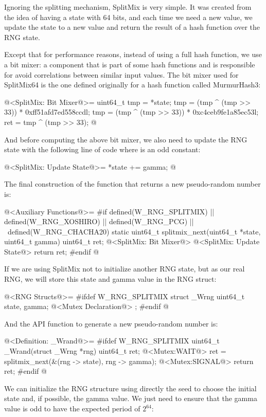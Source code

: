 Ignoring the splitting mechanism, SplitMix is very simple. It was
created from the idea of having a state with 64 bits, and each time we
need a new value, we update the state to a new value and return the
result of a hash function over the RNG state.

Except that for performance reasons, instead of using a full hash
function, we use a bit mixer: a component that is part of some hash
functions and is responsible for avoid correlations between similar
input values. The bit mixer used for SplitMix64 is the one defined
originally for a hash function called MurmurHash3:

\iniciocodigo
@<SplitMix: Bit Mixer@>=
{
  uint64_t tmp = *state;
  tmp = (tmp ^ (tmp >> 33)) * 0xff51afd7ed558ccdl;
  tmp = (tmp ^ (tmp >> 33)) * 0xc4ceb9fe1a85ec53l;
  ret = tmp ^ (tmp >> 33);
} 
@
\fimcodigo

And before computing the above bit mixer, we also need to update the
RNG state with the following line of code where  is
an odd constant:

\iniciocodigo
@<SplitMix: Update State@>=
{
  *state +=  gamma;
} 
@
\fimcodigo

The final construction of the function that returns a new
pseudo-random number is:

\iniciocodigo
@<Auxiliary Functions@>=
#if defined(W_RNG_SPLITMIX) || defined(W_RNG_XOSHIRO) || defined(W_RNG_PCG) || \
  defined(W_RNG_CHACHA20)
static uint64_t splitmix_next(uint64_t *state, uint64_t gamma){
  uint64_t ret;
  @<SplitMix: Bit Mixer@>
  @<SplitMix: Update State@>
  return ret;
}
#endif
@
\fimcodigo

If we are using SplitMix not to initialize another RNG state, but as
our real RNG, we will store this state and gamma value in the RNG
struct:

\iniciocodigo
@<RNG Structs@>=
#ifdef W_RNG_SPLITMIX
struct _Wrng{
  uint64_t state, gamma;
  @<Mutex Declaration@>
};
#endif
@
\fimcodigo

And the API function to generate a new pseudo-random number is:

\iniciocodigo
@<Definition: \_Wrand@>=
#ifdef W_RNG_SPLITMIX
uint64_t _Wrand(struct _Wrng *rng){
  uint64_t ret;
  @<Mutex:WAIT@>
  ret = splitmix_next(&(rng -> state), rng -> gamma);
  @<Mutex:SIGNAL@>
  return ret;
}
#endif
@
\fimcodigo

We can initialize the RNG structure using directly the seed to choose
the initial state and, if possible, the gamma value. We just need to
ensure that the gamma value is odd to have the expected period of
$2^{64}$:

